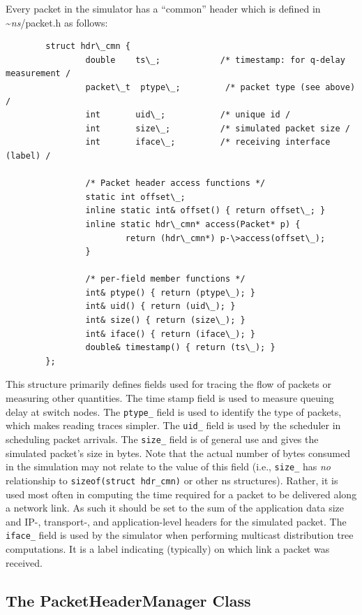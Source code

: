 Every packet in the simulator has a ``common''
header which is defined in \textasciitilde\emph{ns}/{packet.h} as follows:
\begin{verbatim}
        struct hdr\_cmn {
                double    ts\_;            /* timestamp: for q-delay measurement /
                packet\_t  ptype\_;         /* packet type (see above) /
                int       uid\_;           /* unique id /
                int       size\_;          /* simulated packet size /
                int       iface\_;         /* receiving interface (label) /
         
                /* Packet header access functions */
                static int offset\_;
                inline static int& offset() { return offset\_; }
                inline static hdr\_cmn* access(Packet* p) {
                        return (hdr\_cmn*) p-\>access(offset\_);
                }

                /* per-field member functions */
                int& ptype() { return (ptype\_); }
                int& uid() { return (uid\_); }
                int& size() { return (size\_); }
                int& iface() { return (iface\_); }
                double& timestamp() { return (ts\_); }
        };
\end{verbatim}
This structure primarily defines fields used for tracing
the flow of packets or measuring other quantities.
The time stamp field is used to measure queuing delay
at switch nodes.
The {\tt ptype\_} field is used to identify the
type of packets, which makes reading traces simpler.
The {\tt uid\_} field is used by the scheduler in scheduling
packet arrivals.
The {\tt size\_} field is of general use and gives the
simulated packet's size in bytes.
Note that the actual number of bytes consumed in the simulation
may not relate to the value of this field
  (i.e., {\tt size\_} has \emph{no} relationship
  to {\tt sizeof(struct hdr\_cmn)} or other ns structures).
Rather, it is used most often in computing the time required for a packet
to be delivered along a network link.
As such it should be set to the sum of the
  application data size
  and IP-, transport-, and application-level headers
  for the simulated packet.
The {\tt iface\_} field is used by the simulator when performing
multicast distribution tree computations.
It is a label indicating (typically) on which link a packet was received.

\subsection{The PacketHeaderManager Class}
\label{sec:packethdrmgr}

